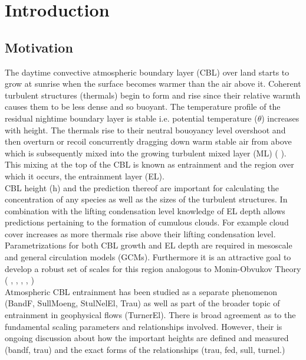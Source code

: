 
\chapter{Introduction} 
\label{ch:Introduction}
\setlength{\parindent}{0cm}

\section{Motivation}
\label{sec:Mot}

The daytime convective atmospheric boundary layer (\acs{CBL}) over land starts to grow at sunrise when the surface becomes warmer than the air above it.  Coherent turbulent structures (thermals) begin to form and rise since their relative warmth causes them to be less dense and so buoyant.  The temperature profile of the residual nightime boundary layer is stable i.e. potential temperature ($\theta$) increases with height.  The thermals rise to their neutral bouoyancy level overshoot and then overturn or recoil concurrently dragging down warm stable air from above which is subsequently mixed into the growing turbulent mixed layer (\acs{ML}) (\citeauthor{Stull-BLMetIntro} \citeyear{Stull-BLMetIntro}).  This mixing at the top of the \acs{CBL} is known as entrainment and the region over which it occurs, the entrainment layer (\acs{EL}).\\

\acs{CBL} height (h) and the prediction thereof are important for calculating the concentration of any species as well as the sizes of the turbulent structures.  In combination with the lifting condensation level knowledge of \acs{EL} depth allows predictions pertaining to the formation of cumulous clouds.  For example cloud cover increases as more thermals rise above their lifting condensation level.  Parametrizations for both \acs{CBL} growth and \acs{EL} depth are required in mesoscale and general circulation models (\acs{GCM}s).  Furthermore it is an attractive goal to develop a robust set of scales for this region analogous to Monin-Obvukov Theory (\citeauthor{Stull-BLMetIntro} \citeyear{Stull-BLMetIntro}, \citeauthor{Traum11} \citeyear{Traum11}, \citeauthor{SteynBaldHoff} \citeyear{SteynBaldHoff}, \citeauthor{StullNelEl} \citeyear{StullNelEl}, \citeauthor{Sorbjan} \citeyear{Sorbjan})\\

Atmospheric \acs{CBL} entrainment has been studied as a separate phenomenon (BandF, SullMoeng, StulNelEl, Trau) as well as part of the broader topic of entrainment in geophysical flows (TurnerEl). There is broad agreement as to the fundamental scaling parameters and relationships involved.  However, their is ongoing discussion about how the important heights are defined and measured (bandf, trau) and the exact forms of the relationships (trau, fed, sull, turnel.)

